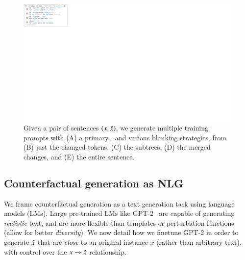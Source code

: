 \begin{figure}[t]
\centering
\includegraphics[trim={0 30.7cm 53.2cm 0cm}, clip, width=1\columnwidth]{figures/blank.pdf}
\vspace{-15pt}
\caption{Given a pair of sentences $(x, \hat{x})$, we generate multiple training prompts with (A) a primary \tagstr, and various blanking strategies, from (B) just the changed tokens, (C) the subtrees, (D) the merged changes, and (E) the entire sentence.
}
\vspace{-10pt}
\label{fig:blank}
\end{figure}

\subsection{Counterfactual generation as NLG}

We frame counterfactual generation as a text generation task using language models (LMs).
Large pre-trained LMs like GPT-2~\cite{radford2019language} are capable of generating \emph{realistic} text, and are more flexible than templates \cite{ribeiro2018sear} or perturbation functions \cite{wu2019errudite} (\ie allow for better \emph{diversity}). 
We now detail how we finetune GPT-2 in order to generate $\hat{x}$ that are \emph{close} to an original instance $x$ (rather than arbitrary text), with control over the $x\rightarrow \hat{x}$ relationship.

